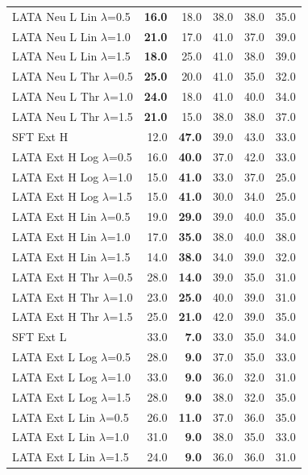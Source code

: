\begin{longtable}{lrrrrr}
LATA Neu L Lin $\lambda$=0.5 & \textbf{16.0} & 18.0 & 38.0 & 38.0 & 35.0 \\
LATA Neu L Lin $\lambda$=1.0 & \textbf{21.0} & 17.0 & 41.0 & 37.0 & 39.0 \\
LATA Neu L Lin $\lambda$=1.5 & \textbf{18.0} & 25.0 & 41.0 & 38.0 & 39.0 \\
LATA Neu L Thr $\lambda$=0.5 & \textbf{25.0} & 20.0 & 41.0 & 35.0 & 32.0 \\
LATA Neu L Thr $\lambda$=1.0 & \textbf{24.0} & 18.0 & 41.0 & 40.0 & 34.0 \\
LATA Neu L Thr $\lambda$=1.5 & \textbf{21.0} & 15.0 & 38.0 & 38.0 & 37.0 \\
SFT Ext H & 12.0 & \textbf{47.0} & 39.0 & 43.0 & 33.0 \\
LATA Ext H Log $\lambda$=0.5 & 16.0 & \textbf{40.0} & 37.0 & 42.0 & 33.0 \\
LATA Ext H Log $\lambda$=1.0 & 15.0 & \textbf{41.0} & 33.0 & 37.0 & 25.0 \\
LATA Ext H Log $\lambda$=1.5 & 15.0 & \textbf{41.0} & 30.0 & 34.0 & 25.0 \\
LATA Ext H Lin $\lambda$=0.5 & 19.0 & \textbf{29.0} & 39.0 & 40.0 & 35.0 \\
LATA Ext H Lin $\lambda$=1.0 & 17.0 & \textbf{35.0} & 38.0 & 40.0 & 38.0 \\
LATA Ext H Lin $\lambda$=1.5 & 14.0 & \textbf{38.0} & 34.0 & 39.0 & 32.0 \\
LATA Ext H Thr $\lambda$=0.5 & 28.0 & \textbf{14.0} & 39.0 & 35.0 & 31.0 \\
LATA Ext H Thr $\lambda$=1.0 & 23.0 & \textbf{25.0} & 40.0 & 39.0 & 31.0 \\
LATA Ext H Thr $\lambda$=1.5 & 25.0 & \textbf{21.0} & 42.0 & 39.0 & 35.0 \\
SFT Ext L & 33.0 & \textbf{7.0} & 33.0 & 35.0 & 34.0 \\
LATA Ext L Log $\lambda$=0.5 & 28.0 & \textbf{9.0} & 37.0 & 35.0 & 33.0 \\
LATA Ext L Log $\lambda$=1.0 & 33.0 & \textbf{9.0} & 36.0 & 32.0 & 31.0 \\
LATA Ext L Log $\lambda$=1.5 & 28.0 & \textbf{9.0} & 38.0 & 32.0 & 35.0 \\
LATA Ext L Lin $\lambda$=0.5 & 26.0 & \textbf{11.0} & 37.0 & 36.0 & 35.0 \\
LATA Ext L Lin $\lambda$=1.0 & 31.0 & \textbf{9.0} & 38.0 & 35.0 & 33.0 \\
LATA Ext L Lin $\lambda$=1.5 & 24.0 & \textbf{9.0} & 36.0 & 36.0 & 31.0 \\

\end{longtable}
